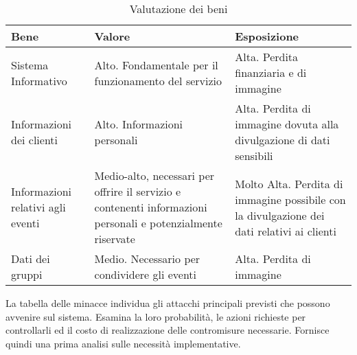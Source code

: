 \begin{table}[htb]
    \begin{tabular} {|P{3.5cm}|P{5.5cm}|P{6.7cm}|}
        \hline
        \textbf{Bene}                     & \textbf{Valore}                                                                                              & \textbf{Esposizione}      \\
        \hline
        Sistema Informativo               & Alto. Fondamentale per il funzionamento del servizio                                                         &
        Alta. Perdita finanziaria e di immagine                                                                                                                                      \\
        \hline
        Informazioni dei clienti          & Alto. Informazioni personali                                                                                 &
        Alta. Perdita di immagine dovuta alla divulgazione
        di dati sensibili                                                                                                                                                            \\
        \hline
        Informazioni relativi agli eventi & Medio-alto, necessari per offrire il servizio e contenenti informazioni personali e potenzialmente riservate &
        Molto Alta. Perdita di immagine possibile con la divulgazione dei dati relativi ai
        clienti                                                                                                                                                                      \\
        \hline
        Dati dei gruppi                   & Medio. Necessario per condividere gli eventi                                                                 & Alta. Perdita di immagine \\
        \hline
    \end{tabular}
    \caption{Valutazione dei beni}
\end{table}

\clearpage

La tabella delle minacce individua gli attacchi principali previsti che possono avvenire sul sistema. 
Esamina la loro probabilità, le azioni richieste per controllarli ed il costo di realizzazione delle contromisure necessarie.
Fornisce quindi una prima analisi sulle necessità implementative.\\
\\


